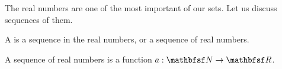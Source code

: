 
\sbasic















\sstart
{}


The real numbers are
one of the most important
of our sets.
Let us discuss sequences of
them.


A 
is a sequence in the real
numbers, or a sequence of
real numbers.


A sequence of real
numbers is a function
$a: \N \to \R$.
\strats
